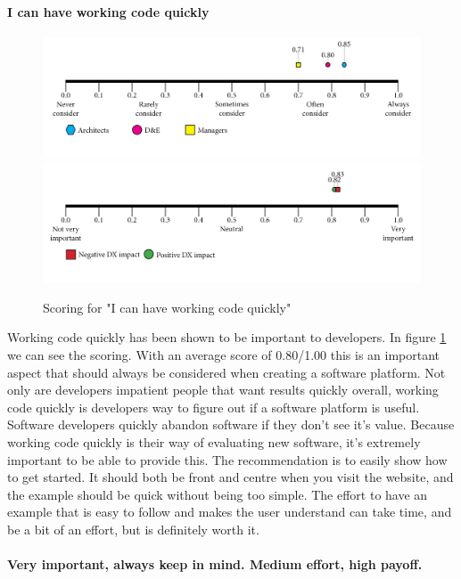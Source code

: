    \paragraph{I can have working code quickly}
    \begin{figure}[H]
        \centering
        \includegraphics[width=\linewidth]{scorelines/aspect2.png}
        \includegraphics[width=\linewidth]{dxscorelines/dxaspect2.png}
        \caption{Scoring for "I can have working code quickly"}
        \label{fig:aspect2}
    \end{figure}
    Working code quickly has been shown to be important to developers. In figure \ref{fig:aspect2} we can see the scoring. With an average score of 0.80/1.00 this is an important aspect that should always be considered when creating a software platform. Not only are developers impatient people that want results quickly overall, working code quickly is developers way to figure out if a software platform is useful. Software developers quickly abandon software if they don't see it's value. Because working code quickly is their way of evaluating new software, it's extremely important to be able to provide this. The recommendation is to easily show how to get started. It should both be front and centre when you visit the website, and the example should be quick without being too simple. The effort to have an example that is easy to follow  and makes the user understand can take time, and be a bit of an effort, but is definitely worth it.\\ \\
    \textbf{Very important, always keep in mind. Medium effort, high payoff.}
